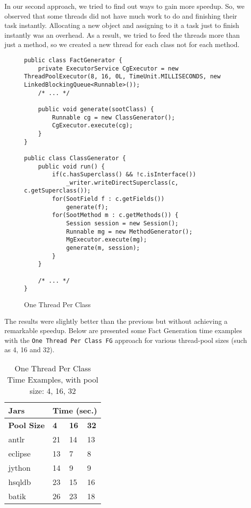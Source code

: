 \documentclass{dithesis}
\begin{document}
        In our second approach, we tried to find out ways to gain more speedup. So, we observed that some threads did not have much work to do and finishing their task instantly. Allocating a new object and assigning to it a task just to finish instantly was an overhead. As a result, we tried to feed the threads more than just a method, so we created a new thread for each class not for each method.
        \begin{figure}[H]
\begin{lstlisting}
public class FactGenerator {
    private ExecutorService CgExecutor = new ThreadPoolExecutor(8, 16, 0L, TimeUnit.MILLISECONDS, new LinkedBlockingQueue<Runnable>());
    /* ... */

    public void generate(sootClass) {
        Runnable cg = new ClassGenerator();
        CgExecutor.execute(cg);
    }
}

public class ClassGenerator {
    public void run() {
        if(c.hasSuperclass() && !c.isInterface())
            _writer.writeDirectSuperclass(c, c.getSuperclass());
        for(SootField f : c.getFields())
            generate(f);
        for(SootMethod m : c.getMethods()) {
            Session session = new Session();
            Runnable mg = new MethodGenerator();
            MgExecutor.execute(mg);
            generate(m, session);
        }
    }

    /* ... */
}
\end{lstlisting}
        \caption{One Thread Per Class}
        \end{figure}

        The results were slightly better than the previous but without achieving a remarkable speedup. Below are presented some Fact Generation time examples with the \texttt{One Thread Per Class FG} approach for various thread-pool sizes (such as 4, 16 and 32).
        \begin{table}[H]
			\centering
            \begin{tabular}{@{}l|lll@{}}
            \toprule
            \textbf{Jars}    	& \multicolumn{3}{l}{\textbf{Time (sec.)}}  \\ \midrule
            \textbf{Pool Size} 	& \textbf{4}  & \textbf{16}  & \textbf{32}  \\ \midrule
            antlr            	& 21          & 14           & 13           \\
            eclipse          	& 13          & 7            & 8            \\
            jython           	& 14          & 9            & 9            \\
            hsqldb           	& 23          & 15           & 16           \\
            batik            	& 26          & 23           & 18           \\ \bottomrule
            \end{tabular}
            \newline
			\caption[One Thread Per Class Time Examples]{One Thread Per Class Time Examples, with pool size: 4, 16, 32}
		\end{table}
\end{document}

